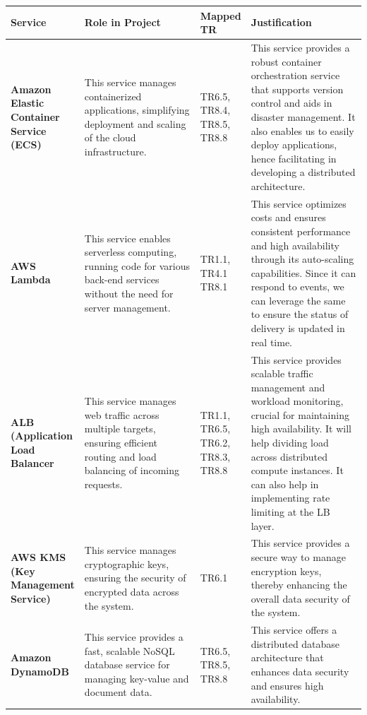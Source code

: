 \documentclass{article}
\begin{document}
\begin{table}[H]
    \centering
    \def\arraystretch{1.5}
    
    \begin{tabular}{|p{0.1\linewidth}| p{0.4\linewidth} | p{0.1\linewidth} | p{0.4\linewidth} |} \hline 
    \textbf{Service}&  \textbf{Role in Project}&  \textbf{Mapped TR}& \textbf{Justification}\\ \hline 
         
    \textbf{Amazon Elastic Container Service (ECS) \cite{ecs}} &  This service manages containerized applications, simplifying deployment and scaling of the cloud infrastructure.& TR6.5, TR8.4, TR8.5, TR8.8 & This service provides a robust container orchestration service that supports version control and aids in disaster management. It also enables us to easily deploy applications, hence facilitating in developing a distributed architecture.\\ \hline 
    
    \textbf{AWS Lambda \cite{lambda}} &  This service enables serverless computing, running code for various back-end services without the need for server management.& TR1.1, TR4.1 TR8.1  & This service optimizes costs and ensures consistent performance and high availability through its auto-scaling capabilities. Since it can respond to events, we can leverage the same to ensure the status of delivery is updated in real time. \\ \hline 
    
    \textbf{ALB (Application Load Balancer \cite{alb}} &  This service manages web traffic across multiple targets, ensuring efficient routing and load balancing of incoming requests.& TR1.1, TR6.5, TR6.2, TR8.3, TR8.8  & This service provides scalable traffic management and workload monitoring, crucial for maintaining high availability. It will help dividing load across distributed compute instances. It can also help in implementing rate limiting at the LB layer. \\ \hline 
        
    \textbf{AWS KMS (Key Management Service) \cite{kms}} &  This service manages cryptographic keys, ensuring the security of encrypted data across the system.& TR6.1 & This service provides a secure way to manage encryption keys, thereby enhancing the overall data security of the system. \\ \hline 
    
    \textbf{Amazon DynamoDB \cite{dynamo}} &  This service provides a fast, scalable NoSQL database service for managing key-value and document data.& TR6.5, TR8.5, TR8.8  & This service offers a distributed database architecture that enhances data security and ensures high availability.\\ \hline 


\end{tabular}
\end{table}
\end{document}
